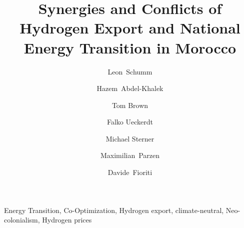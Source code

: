 \documentclass[5p]{elsarticle}
\begin{document}
\begin{frontmatter}

	\title{Synergies and Conflicts of Hydrogen Export and National Energy Transition in Morocco}
    
	\author[tub, oth]{Leon~Schumm}
	\author[ieg]{Hazem~Abdel-Khalek}
	\author[tub]{Tom Brown}
	\author[pik]{Falko Ueckerdt}
	\author[oth]{Michael Sterner}
	\author[uoe]{Maximilian~Parzen}
	\author[unipi]{Davide~Fioriti}


	\address[tub]{Department of Digital Transformation in Energy Systems, Institute of Energy Technology, Technische Universität Berlin, Fakultät III, Einsteinufer 25 (TA 8), 10587 Berlin, Germany}
	\address[oth]{Research Center on Energy Transmission and Storage (FENES), Faculty of Electrical and Information Technology, University of Applied Sciences (OTH) Regensburg, Seybothstrasse 2, 93053 Regensburg, Germany}
	\address[ieg]{Fraunhofer Research Institution for Energy Infrastructures and Geothermal Systems IEG, Cottbus, Germany}
	\address[pik]{Potsdam Institute for Climate Impact Research (PIK), Potsdam, Germany}
	\address[uoe]{University of Edinburgh, Institute for Energy Systems, EH9 3DW Edinburgh, United Kingdom}
	\address[unipi]{University of Pisa, Department of Energy, Systems, Territory and Construction Engineering, Largo Lucio Lazzarino, 56122 Pisa, Italy}

	\begin{abstract}
		
	\end{abstract}

	\begin{keyword}
		Energy Transition, Co-Optimization, Hydrogen export, climate-neutral, Neo-colonialism, Hydrogen prices
	\end{keyword}



\end{frontmatter}
\end{document}
